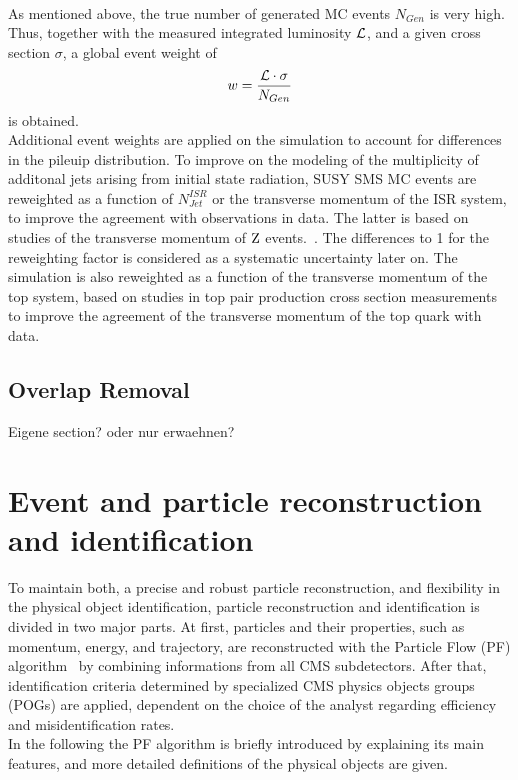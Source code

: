 \\
As mentioned above, the true number of generated MC events $N_{Gen}$ is very high. Thus, together with the measured integrated luminosity $\mathcal{L}$, and a given cross section $\sigma$, a global event weight of
\begin{equation}
 w = \frac{\mathcal{L} \cdot \sigma}{N_{Gen}}
\end{equation}
is obtained.\\
Additional event weights are applied on the simulation to account for differences in the pileuip distribution. To improve on the \MadGraph modeling of the multiplicity of additonal jets arising from initial state radiation, SUSY SMS MC events are reweighted as a function of $N^{ISR}_{Jet}$ or the transverse momentum of the ISR system, to improve the agreement with observations in data.
The latter is based on studies of the transverse momentum of $\mathrm{Z}$ events.~\cite{NISRweight}.
The differences to 1 for the reweighting factor is considered as a systematic uncertainty later on.
The \POWHEG \ttbar simulation is also reweighted as a function of the transverse momentum of the top system, based on studies in top pair production cross section measurements~\cite{topWeight1,topWeight2,topWeight3,topWeight4} to improve the agreement of the transverse momentum of the top quark with data.

\subsection{Overlap Removal}
Eigene section? oder nur erwaehnen?

\section{Event and particle reconstruction and identification}
To maintain both, a precise and robust particle reconstruction, and flexibility in the physical object identification, particle reconstruction and identification is divided in two major parts. At first, particles and their properties, such as momentum, energy, and trajectory, are reconstructed with the Particle Flow (PF) algorithm~\cite{ParticleFlow} by combining informations from all CMS subdetectors. After that, identification criteria determined by specialized CMS physics objects groups (POGs) are applied, dependent on the choice of the analyst regarding efficiency and misidentification rates.\\
In the following the PF algorithm is briefly introduced by explaining its main features, and more detailed definitions of the physical objects are given.


